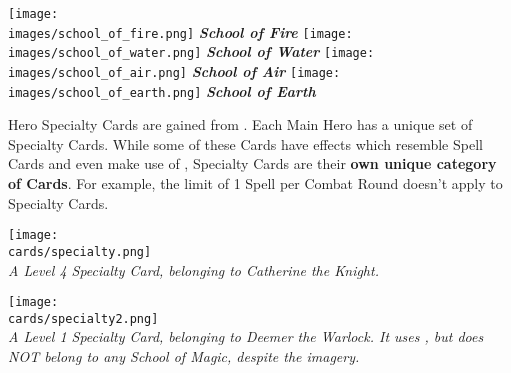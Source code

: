 \begin{multicols*}{2}
\begin{minipage}[t]{0.48\textwidth}
  \centering
    \centering
    \texttt{[image: \\images/school\_of\_fire.png]}
    \textit{\textbf{\textcolor{darkcandyapplered}{School of Fire}}}
  \endminipage
    \centering
    \texttt{[image: \\images/school\_of\_water.png]}
    \textit{\textbf{\textcolor{darkcandyapplered}{School of Water}}}
  \endminipage
  \hfill\allowbreak%
  \bigbreak
    \centering
    \texttt{[image: \\images/school\_of\_air.png]}
    \textit{\textbf{\textcolor{darkcandyapplered}{School of Air}}}
  \endminipage
    \centering
    \texttt{[image: \\images/school\_of\_earth.png]}
    \textit{\textbf{\textcolor{darkcandyapplered}{School of Earth}}}
  \endminipage
  \bigbreak
\end{minipage}
\clearpage

\pagebreak
{}

Hero Specialty Cards are gained from .
Each Main Hero has a unique set of Specialty Cards.
While some of these Cards have effects which resemble Spell Cards and even make use of , Specialty Cards are their \textbf{own unique category of Cards}.
For example, the limit of 1 Spell per Combat Round doesn't apply to Specialty Cards.

{
    \medskip
    \centering
    \texttt{[image: \\cards/specialty.png]}\\
    \medskip
    \footnotesize\textit{A Level 4 Specialty Card, belonging to Catherine the Knight.}
}

{
    \medskip
    \centering
    \texttt{[image: \\cards/specialty2.png]}\\
    \medskip
    \footnotesize\textit{A Level 1 Specialty Card, belonging to Deemer the Warlock. It uses , but does NOT belong to any School of Magic, despite the imagery.}
}

\columnbreak
{}


\end{multicols*}
